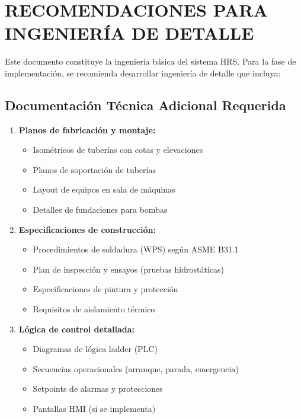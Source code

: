 \documentclass[12pt,a4paper]{article}
\begin{document}
\newpage

\section{RECOMENDACIONES PARA INGENIERÍA DE DETALLE}

Este documento constituye la ingeniería básica del sistema HRS. Para la fase de implementación, se recomienda desarrollar ingeniería de detalle que incluya:

\subsection{Documentación Técnica Adicional Requerida}

\begin{enumerate}
    \item \textbf{Planos de fabricación y montaje:}
    \begin{itemize}
        \item Isométricos de tuberías con cotas y elevaciones
        \item Planos de soportación de tuberías
        \item Layout de equipos en sala de máquinas
        \item Detalles de fundaciones para bombas
    \end{itemize}
    
    \item \textbf{Especificaciones de construcción:}
    \begin{itemize}
        \item Procedimientos de soldadura (WPS) según ASME B31.1
        \item Plan de inspección y ensayos (pruebas hidrostáticas)
        \item Especificaciones de pintura y protección
        \item Requisitos de aislamiento térmico
    \end{itemize}
    
    \item \textbf{Lógica de control detallada:}
    \begin{itemize}
        \item Diagramas de lógica ladder (PLC)
        \item Secuencias operacionales (arranque, parada, emergencia)
        \item Setpoints de alarmas y protecciones
        \item Pantallas HMI (si se implementa)
    \end{itemize}
    

\end{enumerate}
\end{document}
